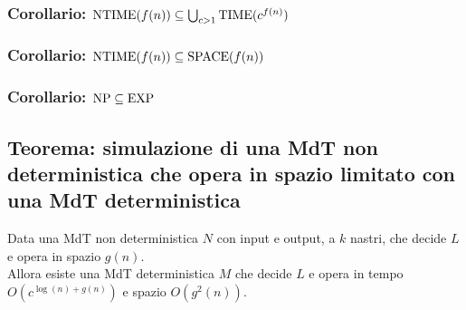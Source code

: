 \subsubsection{Corollario: $\text{NTIME}(f(n)) \subseteq \bigcup_{c>1} \text{TIME}(c^{f(n)})$}
\subsubsection{Corollario: $\text{NTIME}(f(n)) \subseteq \text{SPACE}(f(n))$}
\subsubsection{Corollario: $\text{NP} \subseteq \text{EXP}$}


\subsection{Teorema: simulazione di una MdT non deterministica che opera in spazio limitato con una MdT deterministica}
\label{theorem:non_deterministic_space_to_deterministic_time}
Data una MdT non deterministica $N$ con input e output, a $k$ nastri,
che decide $L$ e opera in spazio $g(n)$. \\
Allora esiste una MdT deterministica $M$ 
che decide $L$ e opera in tempo $O(c^{\log(n) + g(n)})$ e spazio $O(g^2(n))$.
